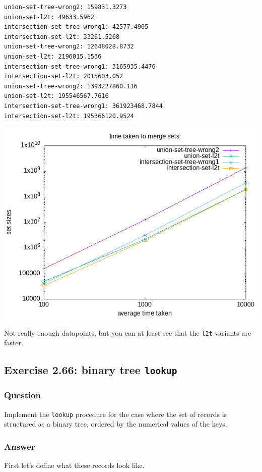 \documentclass[final,fleqn,titlepage,twoside]{article}
\begin{document}
\begin{verbatim}
union-set-tree-wrong2: 159831.3273
union-set-l2t: 49633.5962
intersection-set-tree-wrong1: 42577.4905
intersection-set-l2t: 33261.5268
union-set-tree-wrong2: 12648028.8732
union-set-l2t: 2196015.1536
intersection-set-tree-wrong1: 3165935.4476
intersection-set-l2t: 2015603.052
union-set-tree-wrong2: 1393227860.116
union-set-l2t: 195546567.7616
intersection-set-tree-wrong1: 361923468.7844
intersection-set-l2t: 195366120.9524
\end{verbatim}

\begin{center}
\includegraphics[width=.9\linewidth]{2/fig/2-65.png}
\end{center}

Not really enough datapoints, but you can at least see that the \texttt{l2t} variants
are faster.

\subsection{Exercise 2.66: binary tree \texttt{lookup}}
\label{sec:orgd0719d7}
\subsubsection{Question}
\label{sec:org9f3a147}
Implement the \texttt{lookup} procedure for the case where the set of records
is structured as a binary tree, ordered by the numerical values of the keys.

\subsubsection{Answer}
\label{sec:org64dbf25}
First let's define what these records look like.
\end{document}
